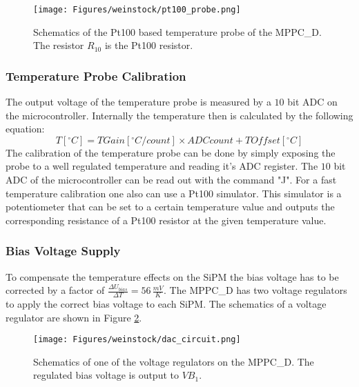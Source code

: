 \documentclass[]{article}
\begin{document}
	\begin{figure}[t]
		\centering
			\texttt{[image: Figures/weinstock/pt100\_probe.png]}
		\caption{Schematics of the Pt100 based temperature probe of the MPPC\_D. The resistor $R_{10}$ is the Pt100 resistor.}
		\label{pt100_probe}
	\end{figure}	
 
\subsubsection{Temperature Probe Calibration}

The output voltage of the temperature probe is measured by a $10$ bit ADC on the microcontroller. Internally the temperature then is calculated by the following equation:
\begin{equation}
	T[^{\circ}C] = TGain[^{\circ}C/count] \times ADCcount + TOffset[^{\circ}C]
\end{equation}
The calibration of the temperature probe can be done by simply exposing the probe to a well regulated temperature and reading it's ADC register. The $10$ bit ADC of the microcontroller
can be read out with the command "J". For a fast temperature calibration one also can use a Pt100 simulator. This simulator is a potentiometer that can be set to a certain 
temperature value and outputs the corresponding resistance of a Pt100 resistor at the given temperature value. 

\newpage

\subsubsection{Bias Voltage Supply}

To compensate the temperature effects on the SiPM the bias voltage has to be corrected by a factor of $\frac{\Delta U_{bias}}{\Delta T} = 56\,\frac{mV}{K}$. The MPPC\_D has two 
voltage regulators to apply the correct bias voltage to each SiPM. The schematics of a voltage regulator are shown in Figure \ref{voltage_regulator}. 
	
	\begin{figure}[t]
		\centering
			\texttt{[image: Figures/weinstock/dac\_circuit.png]}
		\caption{Schematics of one of the voltage regulators on the MPPC\_D. The regulated bias voltage is output to $VB_1$.}
		\label{voltage_regulator}
	\end{figure}	
\end{document}
